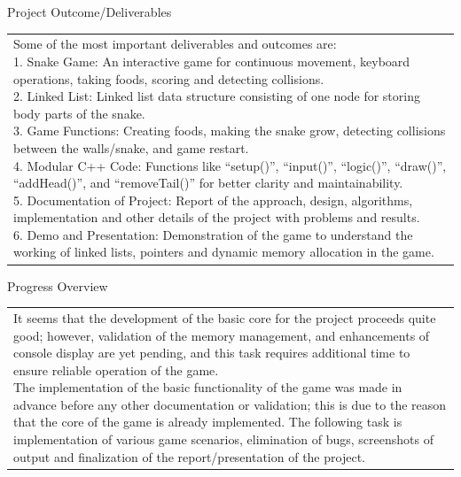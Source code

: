 \documentclass[12pt,a4paper]{article}
\newcommand{\sectiontitle}[1]{%
    {\color{GEUBlue}
    \fontsize{18}{22}\selectfont #1}
}
\newcommand{\answerbox}[2]{%
    \begin{tabularx}{\textwidth}{
        |>{\raggedright\arraybackslash}X|}
        \hline
        \parbox[t][#1][t]{\dimexpr\linewidth-12pt\relax}{
            \vspace{5pt}
            \fontsize{11}{13}\selectfont #2
        }\\
        \hline
    \end{tabularx}
}
\begin{document}
\newpage


\vspace*{0.30cm}

\sectiontitle{Project Outcome/Deliverables}

\vspace{0.05cm}

\vspace{0.35cm}

\answerbox{9.50cm}{Some of the most important deliverables and outcomes are:\\

1. Snake Game: An interactive game for continuous movement, keyboard operations, taking foods, scoring and detecting collisions. \\

2. Linked List: Linked list data structure consisting of one node for storing body parts of the snake. \\

3. Game Functions: Creating foods, making the snake grow, detecting collisions between the walls/snake, and game restart. \\

4. Modular C++ Code: Functions like “setup()”, “input()”, “logic()”, “draw()”, “addHead()”, and “removeTail()” for better clarity and maintainability.\\

5. Documentation of Project: Report of the approach, design, algorithms, implementation and other details of the project with problems and results.\\ 

6. Demo and Presentation: Demonstration of the game to understand the working of linked lists, pointers and dynamic memory allocation in the game.}

\vspace{0.75cm}

\sectiontitle{Progress Overview}

\vspace{0.05cm}

\vspace{0.25cm}

\answerbox{4.45cm}{It seems that the development of the basic core for the project proceeds quite good; however, validation of the memory management, and enhancements of console display are yet pending, and this task requires additional time to ensure reliable operation of the game.\\

The implementation of the basic functionality of the game was made in advance before any other documentation or validation; this is due to the reason that the core of the game is already implemented. The following task is implementation of various game scenarios, elimination of bugs, screenshots of output and finalization of the report/presentation of the project.}
\end{document}
